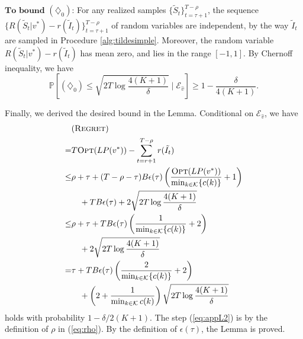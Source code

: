 \documentclass{article}
\theoremstyle{definition}
\newcommand{\PPP}{\mathbb{P}}
\newcommand{\KKK}{\mathcal{K}}
\begin{document}
$\textbf{To bound $(\diamondsuit_0)$:}$ For any realized samples $\{\tilde{S}_t\}^{T-\rho}_{t = \tau  +1}$, the sequence $\{R(\tilde{S}_t|v^*) - r(\tilde{I}_t)\}^{T-\rho}_{t = \tau + 1}$ of random variables are independent, by the way $\tilde{I}_t$ are sampled in Procedure \ref{alg:tildesimple}. Moreover, the random variable $R(\tilde{S}_t|v^*) - r(\tilde{I}_t)$ has mean zero, and lies in the range $[-1, 1]$. By Chernoff inequality, we have $$\PPP\left[(\diamondsuit_0)\leq \sqrt{2T\log{\frac{4(K+1)}{\delta}}}\mid \mathcal{E}_{\hat{v}}\right] \geq 1 - \frac{\delta}{4(K+1)} .$$

Finally, we derived the desired bound in the Lemma. Conditional on $\mathcal{E}_{\hat{v}}$, we have
\begin{align}
&(\text{{\sc Regret}})\nonumber\\
= &T\text{{\sc Opt}}(LP(v^*)) - \sum^{T-\rho}_{t = r+1}r(\tilde{I_t})\nonumber\\
\leq &\rho + \tau + (T-\rho-\tau)B\epsilon(\tau)\left(\frac{\text{{\sc Opt}}(LP(v^*))}{\min_{k\in\KKK}\{c(k)\}} + 1\right) \nonumber\\
&\quad + TB\epsilon(\tau) + 2\sqrt{2T\log\frac{4(K+1)}{\delta}}\nonumber\\
\leq &\rho + \tau + TB\epsilon(\tau)\left(\frac{1}{\min_{k\in\KKK}\{c(k)\}} + 2\right)  \nonumber\\
&\quad + 2\sqrt{2T\log\frac{4(K+1)}{\delta}}\nonumber\\
=&\tau + TB\epsilon(\tau)\left(\frac{2}{\min_{k\in\KKK}\{c(k)\}} + 2\right) \nonumber\\
&\quad +\left(2 + \frac{1}{\min_{k\in \KKK}c(k)}\right)\sqrt{2T\log\frac{4(K+1)}{\delta}} \label{eq:appL2}
\end{align}
holds with probability $1-\delta/2(K+1)$. The step (\ref{eq:appL2}) is by the definition of $\rho$ in (\ref{eq:rho}). By the definition of $\epsilon(\tau)$, the Lemma is proved. 

\end{document}

